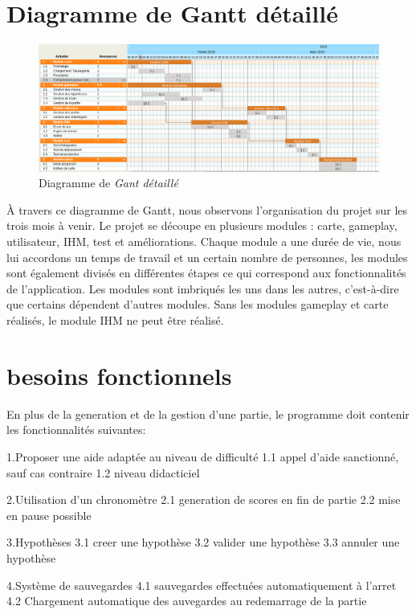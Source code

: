\documentclass{report}
\begin{document}
    \section{Diagramme de Gantt détaillé}
    
    \begin{figure}[H]
	\caption{Diagramme de \textit{Gant détaillé}}
	\includegraphics[width=17cm]{ganttDetaille.png}
    \end{figure}
   
     À travers ce diagramme de Gantt, nous observons l'organisation du projet sur les trois mois à venir. Le projet se découpe en plusieurs modules : carte, gameplay, utilisateur, IHM, test et améliorations.
    Chaque module a une durée de vie, nous lui accordons un temps de travail et un certain nombre de personnes, les modules sont également divisés en différentes étapes ce qui correspond aux fonctionnalités de l'application. Les modules sont imbriqués les uns dans les autres, c'est-à-dire que certains dépendent d'autres modules. Sans les modules gameplay et carte réalisés, le module IHM ne peut être réalisé. 

   \section{besoins fonctionnels}
   
    En plus de la generation et de la gestion d'une partie, le programme doit contenir les fonctionnalités suivantes:
    
    	1.Proposer une aide adaptée au niveau de difficulté
		1.1 appel d'aide sanctionné, sauf cas contraire
		1.2 niveau didacticiel
		
	2.Utilisation d'un chronomètre
		2.1 generation de scores en fin de partie
		2.2 mise en pause possible
		
	3.Hypothèses
		3.1 creer une hypothèse
		3.2 valider une hypothèse
		3.3 annuler une hypothèse
		
	4.Système de sauvegardes
		4.1 sauvegardes effectuées automatiquement à l'arret
		4.2 Chargement automatique des auvegardes au redemarrage de la partie
		
\end{document}
